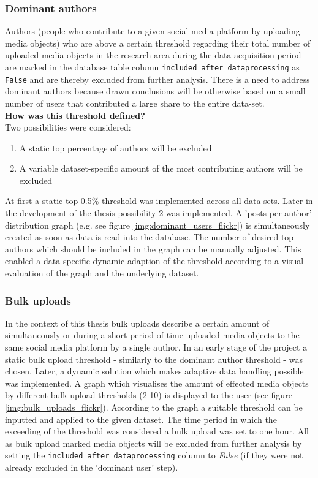 \subsubsection*{Dominant authors} \label{bias_dominant_authors}
Authors (people who contribute to a given social media platform by uploading media objects) who are above a certain threshold regarding their total number of uploaded media objects in the research area during the data-acquisition period are marked in the database table column \texttt{included\_after\_dataprocessing} as \texttt{False} and are thereby excluded from further analysis. There is a need to address dominant authors because drawn conclusions will be otherwise based on a small number of users that contributed a large share to the entire data-set.\\
\newline
\textbf{How was this threshold defined?}\\
\newline
Two possibilities were considered:
\begin{enumerate}
  \item A static top percentage of authors will be excluded
  \item A variable dataset-specific amount of the most contributing authors will be excluded
\end{enumerate}

At first a static top 0.5\% threshold was implemented across all data-sets. Later in the development of the thesis possibility 2 was implemented. A 'posts per author' distribution graph (e.g. see figure \ref{img:dominant_users_flickr}) is simultaneously created as soon as data is read into the database. The number of desired top authors which should be included in the graph can be manually adjusted. This enabled a data specific dynamic adaption of the threshold according to a visual evaluation of the graph and the underlying dataset. 

\subsubsection*{Bulk uploads} \label{bias_bulk_uploads}
In the context of this thesis bulk uploads describe a certain amount of simultaneously or during a short period of time uploaded media objects to the same social media platform by a single author. In an early stage of the project a static bulk upload threshold - similarly to the dominant author threshold - was chosen. Later, a dynamic solution which makes adaptive data handling possible was implemented. A graph which visualises the amount of effected media objects by different bulk upload thresholds (2-10) is displayed to the user (see figure \ref{img:bulk_uploads_flickr}). According to the graph a suitable threshold can be inputted and applied to the given dataset. The time period in which the exceeding of the threshold was considered a bulk upload was set to one hour. 
All as bulk upload marked media objects will be excluded from further analysis by setting the \texttt{included\_after\_dataprocessing} column to \textit{False} (if they were not already excluded in the 'dominant user' step).

